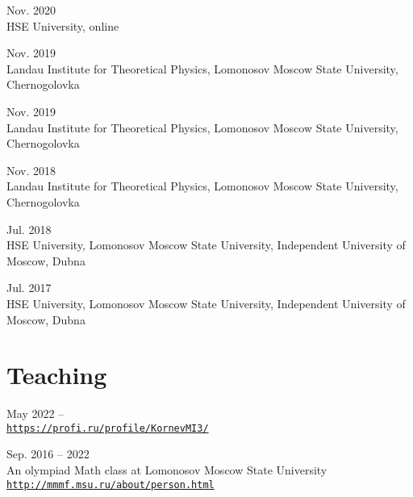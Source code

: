 \documentclass[11pt,letterpaper]{report}
\begin{document}
\begin{tablist}
       \item{Nov. 2020} \\ HSE University, online
       
       \item{Nov. 2019} \\ Landau Institute for Theoretical Physics, Lomonosov Moscow State University, Chernogolovka
       
       \item{Nov. 2019} \\ Landau Institute for Theoretical Physics, Lomonosov Moscow State University, Chernogolovka
       
        \item{Nov. 2018} \\ Landau Institute for Theoretical Physics, Lomonosov Moscow State University, Chernogolovka
       
       \item{Jul. 2018} \\ HSE University, Lomonosov Moscow State University, Independent University of Moscow, Dubna
       
        \item{Jul. 2017} \\ HSE University, Lomonosov Moscow State University, Independent University of Moscow, Dubna
        
            
    \end{tablist}

    
    
    
    
    \section*{Teaching}

    \begin{tablist}
    
       \item{May 2022 --} \\ \href{https://profi.ru/profile/KornevMI3/}{\tt https://profi.ru/profile/KornevMI3/} 

        \item{Sep. 2016 -- 2022} \\ An olympiad Math class at Lomonosov Moscow State University\\ \href{http://mmmf.msu.ru/about/person.html}{\tt http://mmmf.msu.ru/about/person.html}
        
    \end{tablist}
    
\end{document}
